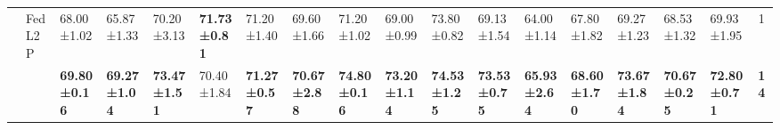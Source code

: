 \begin{table*}[]
\begin{scriptsize}
{\begin{tabular}{c|l|l|l|l|l|l|l|l|l|l|l|l|l|l|l|l|c}
                    & FedL2P                               & 68.00±1.02                        & 65.87±1.33                       & 70.20±3.13                        & \textbf{71.73±0.81}              & 71.20±1.40                        & 69.60±1.66                        & 71.20±1.02                        & 69.00±0.99                        & 73.80±0.82                        & 69.13±1.54                       & 64.00±1.14                        & 67.80±1.82                        & 69.27±1.23                       & 68.53±1.32                       & 69.93±1.95                       & 1             \\ %
                    & \method{}                                 & \textbf{69.80±0.16}               & \textbf{69.27±1.04}              & \textbf{73.47±1.51}              & 70.40±1.84                        & \textbf{71.27±0.57}              & \textbf{70.67±2.88}              & \textbf{74.80±0.16}               & \textbf{73.20±1.14}               & \textbf{74.53±1.25}              & \textbf{73.53±0.75}              & \textbf{65.93±2.64}              & \textbf{68.60±1.70}                & \textbf{73.67±1.84}              & \textbf{70.67±0.25}              & \textbf{72.80±0.71}               & \textbf{14}   \\ \bottomrule
\end{tabular}
}
\end{scriptsize}
\vspace{-1.2em}
\end{table*}
